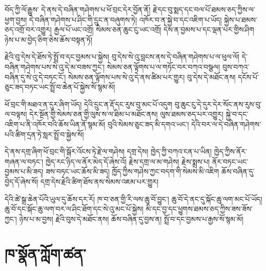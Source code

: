 \documentclass[12pt]{nextbook}
\begin{document}
\begin{readersection}{བོད་ཀྱི་ལོ་རྒྱུས་}
དེ་ནས་དེ་བཞིན་གཤེགས་པ་ཕོ་བྲང་དེར་བྱོན་ནོ། རྗེ་དང་བུ་སྨད་དང་བལ་པོ་ཐམས་ཅད་ཀྱིས་ལ་ཕྱག་བྱས། དེ་བཞིན་གཤེགས་པ་ཤིང་གི་དྲུང་ན་བཞུགས་ཏེ། འཁོར་བ་ན་སྐྱེ་བ་དང་འཇིག་པ་ཡོད། སྐྱེས་པ་ཐམས་ཅད་འགྲོ་བར་འགྱུར། རྒྱལ་པོ་ཡང་འགྲོ། སེམས་ཅན་ཆུང་ངུ་ཡང་འགྲོ། དེས་ན་བྱམས་པ་དང་ལྡན་པར་གྱིས་ཤིག ཉེས་པ་མ་བྱེད་ཅིག་ཅེས་ཆོས་བསྟན་ཏོ།

རྗེའི་བུ་དེས་དེ་ཐོས་ཏེ་སྤྲོ་བ་དང་བྱམས་པ་སྐྱེས། བུ་དེས་སེ་འུ་བླངས་ནས་དེ་བཞིན་གཤེགས་པ་ལ་ཕུལ་ལོ། དེ་བཞིན་གཤེགས་པས་སེ་འུ་དེ་མ་བཟས་ཀྱང་། སེམས་ཅན་ལྟོགས་པ་ལ་གཏོང་བར་བཀའ་བསྩལ། བུས་བཀའ་བཞིན་དུ་སེ་འུ་དེ་བཏང་ངོ་། སེམས་ཅན་ལྟོགས་པས་སེ་འུ་དེ་ནས་ཚིམ་པར་གྱུར། བུ་དེས་དེ་མཐོང་ནས། དངོས་པོ་ཅུང་ཟད་བཏང་ཡང་སྤྲོ་བ་ཆེན་པོ་སྐྱེས་སོ་སྙམ་མོ།

ཕོ་བྲང་གི་མཐའ་ན་དུར་ཞིག་ཡོད། དེའི་དྲུང་ན་རྡོ་དང་རུས་བུ་མང་པོ་འདུག བུ་ཆུང་ངུ་དེ་དུར་དེར་སོང་ནས་རུས་བུ་ལ་བལྟས། དེར་སྔོན་གྱི་སེམས་ཅན་གྱི་ལུས་ས་ལ་ཐིམ་པ་མཐོང་ནས། ལུས་ཐམས་ཅད་པར་འགྱུར། སྐྱེ་བ་དང་འཇིག་པ་ནི་འཁོར་བའི་ཆོས་ཡིན་ནོ་སྙམ་མོ། བུའི་སེམས་ཅུང་ཟད་མི་དགའ་ཡང་། དེའི་བར་ལ་དེ་བཞིན་གཤེགས་པའི་ཚིག་དྲན་ཏེ་སླར་སྤྲོ་བ་སྐྱེས་སོ།

དེ་ནས་དགྲ་ཞིག་ཕོ་བྲང་གི་སྒོར་འོངས་ཏེ་རྗེ་ལ་གཤེས། དགྲ་དེས། ཁྱེད་ཀྱི་བཀའ་ངན་པ་ཡིན། ཁྱེད་ཀྱིས་ནོར་གཞན་ལ་བཏང་། ཁྱེད་རང་ཉིད་ལ་ནོར་མེད་དོ་ཞེས་འོ། རྗེས་དགྲ་ལ་མ་གཤེས། རྗེས་སྨྲས་པ། ནོར་བཏང་ཡང་བྱམས་པ་མི་ཟད། ཟས་བཏང་ཡང་ཆོས་མི་ཟད། ཁྱོད་ཀྱིས་གཤེས་ཀྱང་བདག་གི་སེམས་མི་འཇིག ཆོས་བཞིན་དུ་བྱེད་དོ་ཞེས་སོ། དགྲ་དེས་རྗེའི་ཚིག་ཐོས་ནས་སེམས་འཇམ་པར་གྱུར།

དེའི་ཚེ་སྒྲ་ཆེན་པོའི་ཡུལ་དུ་ཆོས་དར་རོ། ཁ་བ་ཅན་གྱི་རི་ལས་ཆུ་བོ་བྱུང་། ཆུ་བོ་དེ་ནང་དུ་སྐོང་ཆུ་ལག་མང་པོ་ཡོད། ཆུ་བོ་དང་སྐོང་ཆུ་ལག་བར་ལ་ཤིང་ཐོག་དང་སེ་འུ་མང་པོ་སྐྱེས། མི་དང་བྱ་དང་ཕྱུགས་ཐམས་ཅད་ཀྱིས་ཟས་ཟོས་ཀྱང་། ཉེས་པ་མ་བྱས། རྗེའི་བུས་དེ་མཐོང་ནས། ཆོས་བཞིན་དུ་བྱས་ན། སྤྲོ་བ་དང་བྱམས་པ་རྒྱས་སོ་སྙམ་མོ།
\end{readersection}

\chapter{ཁ་སྣོན་ཀློག་ཚན་}
\end{document}
